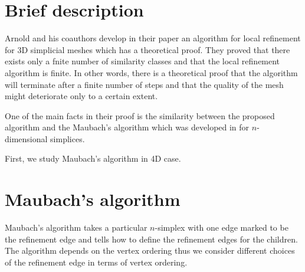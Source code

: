 \documentclass[a4paper,12pt]{amsart}
\numberwithin{equation}{section}
\begin{document}
%	


\section{Brief description}

Arnold and his coauthors develop in their paper \cite{arnold} an algorithm for local refinement for 3D simplicial meshes which has a theoretical proof. They proved that there exists only a fnite number of similarity classes and that the local refinement algorithm is finite. In other words, there is a theoretical proof that the algorithm will terminate after a finite number of steps and that the quality of the mesh might deteriorate only to a certain extent.

One of the main facts in their proof is the similarity between the proposed algorithm and the Maubach's algorithm which was developed in \cite{maubach} for $n$-dimensional simplices.

First, we study Maubach's algorithm in 4D case.

\section{Maubach's algorithm}

Maubach's algorithm takes a particular $n$-simplex with one edge marked to be the refinement edge and tells how to define the refinement edges for the children. The algorithm depends on the vertex ordering thus we consider different choices of the refinement edge in terms of vertex ordering.
\end{document}
